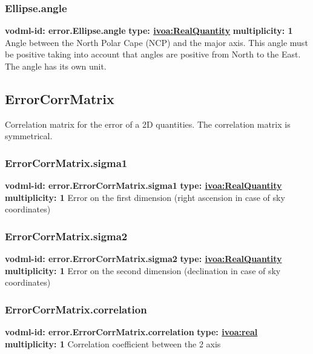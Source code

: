     \subsubsection{Ellipse.angle}
    \textbf{vodml-id: error.Ellipse.angle} \newline
    \textbf{type: \hyperref[sect:ivoa]{ivoa:RealQuantity}} \newline
    \textbf{multiplicity: 1} \newline
    Angle between the North Polar Cape (NCP) and the major axis. This angle must be positive taking into account that angles are positive from North to the East. The angle has its own unit.

  \subsection{ErrorCorrMatrix}
    \label{sect:error.ErrorCorrMatrix}
    Correlation matrix for the error of a 2D quantities. The correlation matrix is symmetrical.

    \subsubsection{ErrorCorrMatrix.sigma1}
    \textbf{vodml-id: error.ErrorCorrMatrix.sigma1} \newline
    \textbf{type: \hyperref[sect:ivoa]{ivoa:RealQuantity}} \newline
    \textbf{multiplicity: 1} \newline
    Error on the first dimension (right ascension in case of sky coordinates)

    \subsubsection{ErrorCorrMatrix.sigma2}
    \textbf{vodml-id: error.ErrorCorrMatrix.sigma2} \newline
    \textbf{type: \hyperref[sect:ivoa]{ivoa:RealQuantity}} \newline
    \textbf{multiplicity: 1} \newline
    Error on the second dimension (declination in case of sky coordinates)

    \subsubsection{ErrorCorrMatrix.correlation}
    \textbf{vodml-id: error.ErrorCorrMatrix.correlation} \newline
    \textbf{type: \hyperref[sect:ivoa]{ivoa:real}} \newline
    \textbf{multiplicity: 1} \newline
    Correlation coefficient between the 2 axis

